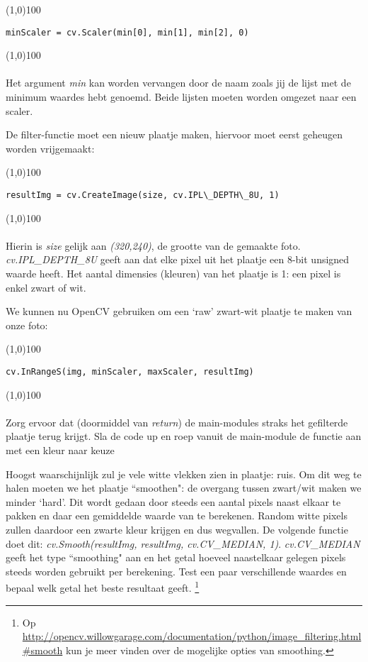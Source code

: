 \documentclass[a4paper]{article}
\begin{document}
\noindent \line(1,0){100}
\begin{verbatim}
minScaler = cv.Scaler(min[0], min[1], min[2], 0)
\end{verbatim}
\noindent \line(1,0){100}
\\\\
Het argument \textit{min} kan worden vervangen door de naam zoals jij de lijst met de minimum waardes hebt genoemd. Beide lijsten moeten worden omgezet naar een scaler.

De filter-functie moet een nieuw plaatje maken, hiervoor moet eerst geheugen worden vrijgemaakt:

\noindent \line(1,0){100}
\begin{verbatim}
resultImg = cv.CreateImage(size, cv.IPL\_DEPTH\_8U, 1)
\end{verbatim}
\noindent \line(1,0){100}
\\\\
Hierin is \textit{size} gelijk aan \textit{(320,240)}, de grootte van de gemaakte foto. \textit{cv.IPL\_DEPTH\_8U} geeft aan dat elke pixel uit het plaatje een 8-bit unsigned waarde heeft. Het aantal dimensies (kleuren) van het plaatje is 1: een pixel is enkel zwart of wit.

We kunnen nu OpenCV gebruiken om een `raw' zwart-wit plaatje te maken van onze foto:

\noindent \line(1,0){100}
\begin{verbatim}
cv.InRangeS(img, minScaler, maxScaler, resultImg)
\end{verbatim}
\noindent \line(1,0){100}
\\\\
Zorg ervoor dat (doormiddel van \textit{return}) de main-modules straks het gefilterde plaatje terug krijgt.
Sla de code up en roep vanuit de main-module de functie aan met een kleur naar keuze

Hoogst waarschijnlijk zul je vele witte vlekken zien in plaatje: ruis. Om dit weg te halen moeten we het plaatje ``smoothen": de overgang tussen zwart/wit maken we minder `hard'. Dit wordt gedaan door steeds een aantal pixels naast elkaar te pakken en daar een gemiddelde waarde van te berekenen. Random witte pixels zullen daardoor een zwarte kleur krijgen en dus wegvallen. De volgende functie doet dit: \textit{cv.Smooth(resultImg, resultImg, cv.CV\_MEDIAN, 1)}. \textit{cv.CV\_MEDIAN} geeft het type ``smoothing" aan en het getal hoeveel naastelkaar gelegen pixels steeds worden gebruikt per berekening. Test een paar verschillende waardes en bepaal welk getal het beste resultaat geeft. \footnote{Op \url{http://opencv.willowgarage.com/documentation/python/image_filtering.html\#smooth} kun je meer vinden over de mogelijke opties van smoothing.}
\end{document}
